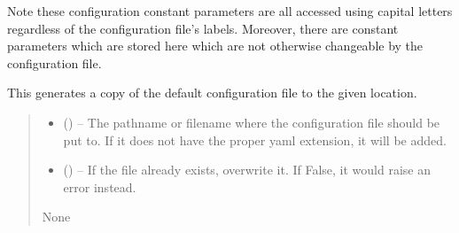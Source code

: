 \documentclass[letterpaper,11pt,english]{sphinxmanual}
\begin{document}
\sphinxAtStartPar
Note these configuration constant parameters are all accessed using capital
letters regardless of the configuration file’s labels. Moreover, there are
constant parameters which are stored here which are not otherwise changeable
by the configuration file.

\begin{savenotes}\begin{fulllineitems}
\label{\detokenize{code/opihiexarata.library.config:opihiexarata.library.config.generate_configuration_file_copy}}
\pysigstartsignatures
{}
\pysigstopsignatures
\sphinxAtStartPar
This generates a copy of the default configuration file to the given
location.
\begin{quote}\begin{description}
\begin{itemize}
\item {} 
\sphinxAtStartPar
{} () – The pathname or filename where the configuration file should be put
to. If it does not have the proper yaml extension, it will be added.

\item {} 
\sphinxAtStartPar
{} (\sphinxstyleliteralemphasis{\sphinxupquote{, }}) – If the file already exists, overwrite it. If False, it would raise
an error instead.

\end{itemize}

\sphinxAtStartPar
None

\end{description}\end{quote}

\end{fulllineitems}\end{savenotes}
\end{document}
